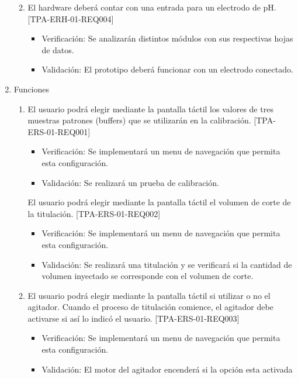 \documentclass[11pt]{charter}
\begin{document}
\begin{enumerate}
\begin{enumerate}
\begin{itemize}
\end{itemize}
	\item El hardware deberá contar con una entrada para un electrodo de pH. [TPA-ERH-01-REQ004]
	\begin{itemize}
\item Verificación: Se analizarán distintos módulos con sus respectivas hojas de datos.\\
\item Validación: El prototipo deberá funcionar con un electrodo conectado.\\
\end{itemize}
\end{enumerate}
	
\item Funciones
	\begin{enumerate}
	\item El usuario podrá elegir mediante la pantalla táctil los valores de tres muestras patrones (buffers) que se utilizarán en la calibración. [TPA-ERS-01-REQ001]
	\begin{itemize}
\item Verificación: Se implementará un menu de navegación que permita esta configuración.\\
\item Validación: Se realizará un prueba de calibración.\\
\end{itemize}
El usuario podrá elegir mediante la pantalla táctil el volumen de corte de la titulación. [TPA-ERS-01-REQ002]
\begin{itemize}
\item Verificación: Se implementará un menu de navegación que permita esta configuración.\\
\item Validación: Se realizará una titulación y se verificará si la cantidad de volumen inyectado se corresponde con el volumen de corte.\\
\end{itemize}
	\item El usuario podrá elegir mediante la pantalla táctil si utilizar o no el agitador. Cuando el proceso de titulación comience, el agitador debe activarse si así lo indicó el usuario. [TPA-ERS-01-REQ003]
	\begin{itemize}
\item Verificación: Se implementará un menu de navegación que permita esta configuración.\\
\item Validación: El motor del agitador encenderá si la opción esta activada\\

\end{itemize}
\end{enumerate}
\end{enumerate}
\end{document}
